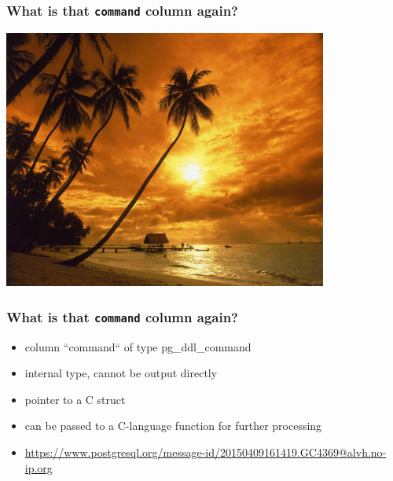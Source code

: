 \frame
{ \frametitle{What is that \texttt{command} column again?}

\pause
\includegraphics[width=0.8\textwidth]{pigeon_point_at_sunset-1280x1024.jpg} \\

}


\frame
{ \frametitle{What is that \texttt{command} column again?}
\begin{itemize}
 \item column ``command`` of type pg\_ddl\_command
 \item internal type, cannot be output directly
 \item pointer to a C struct
 \item can be passed to a C-language function for further processing
 \item \url{https://www.postgresql.org/message-id/20150409161419.GC4369@alvh.no-ip.org}
\end{itemize}

}

